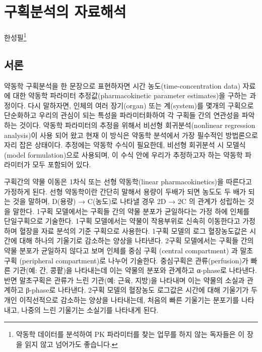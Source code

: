 \documentclass[
  11pt,
  krantz2, a4paper, twoside]{krantz}
\theoremstyle{definition}
\theoremstyle{definition}
\theoremstyle{definition}
\theoremstyle{definition}
\theoremstyle{remark}
\begin{document}
\chapter{구획분석의 자료해석}\label{ca-analysis}

\Large\hfill

한성필\footnote{약동학 데이터를 분석하여 PK 파라미터를 찾는 업무를 하지 않는 독자들은 이 장을 읽지 않고 넘어가도 좋습니다.}

\normalsize

\section{서론}\label{uxc11cuxb860-3}

약동학 구획분석을 한 문장으로 표현하자면 시간 농도(time-concentration data) 자료에 대한 약동학 파라미터 추정값(pharmacokinetic parameter estimates)을 구하는 과정이다. 
다시 말하자면, 인체의 여러 장기(organ) 또는 계(system)를 몇개의 구획으로 단순화하고 우리의 관심이 되는 특성을 파라미터화하여 각 구획들 간의 연관성을 파악하는 것이다.
약동학 파라미터의 추정을 위해서 비선형 회귀분석(nonlinear regression analysis)이 사용 되어 왔고 현재 이 방식은 약동학 분석에서 가장 필수적인 방법론으로 자리 잡은 상태이다. 
추정에는 약동학 수식이 필요한데, 비선형 회귀분석 시 모델식(model formulation)으로 사용되며, 이 수식 안에 우리가 추정하고자 하는 약동학 파라미터가 모두 포함되어 있다. 

구획간의 약물 이동은 1차식 또는 선형 약동학(linear pharmacokinetics)을 따른다고 가정하게 된다. 
선형 약동학이란 간단히 말해서 용량이 두배가 되면 농도도 두 배가 되는 것을 말하며, D(용량) → C(농도)로 나타낼 경우 2D → 2C 의 관계가 성립하는 것을 말한다.
1구획 모델에서는 구획들 간의 약물 분포가 균일하다는 가정 하에 인체를 단일구획으로 기술한다.
1구획 모델에서는 약물이 작용부위로 신속히 이동한다고 가정하며 혈장을 자료 분석의 기준 구획으로 사용한다.
1구획 모델의 로그 혈장농도값은 시간에 대해 하나의 기울기로 감소하는 양상을 나타낸다.
2구획 모델에서는 구획들 간의 약물 분포가 균일하지 않다고 보며 인체를 중심 구획 (central compartment) 과 말초구획 (peripheral compartment)로 나누어 기술한다. 
중심구획은 관류(perfusion)가 빠른 기관(예: 간, 콩팥)을 나타내는데 이는 약물의 분포와 관계하고 α-phase로 나타낸다. 
반면 말초구획은 관류가 느린 기관(예: 근육, 지방)을 나타내며 이는 약물의 소실과 관계하고 β-phase로 나타낸다. 
2구획 모델의 혈장농도 로그값은 시간에 대해 기울기가 두 개인 이직선적으로 감소하는 양상을 나타내는데, 처음의 빠른 기울기는 분포기를 나타내고, 나중의 느린 기울기는 소실기를 나타내게 된다.
\end{document}
